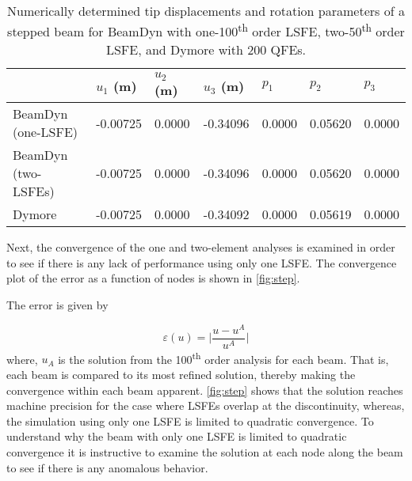 \documentclass[letterpaper,12pt]{article}
\begin{document}

\begin{table}
\caption{\label{tab:step3}Numerically determined tip displacements and rotation parameters of a stepped beam for BeamDyn with one-100\textsuperscript{th} order LSFE, two-50\textsuperscript{th} order LSFE, and Dymore with 200 QFEs. } 
\begin{center}
    \begin{tabular}{| l | l | l | l | l | l | l |}
    	\hline
    	        & $u_1$ (m) & $u_2$ (m) & $u_3$ (m) & $p_1$  & $p_2$   & $p_3$  \\ \hline
    	BeamDyn (one-LSFE) & -0.00725     & 0.0000       & -0.34096     & 0.0000 & 0.05620 & 0.0000 \\ \hline
    		BeamDyn (two-LSFEs) & -0.00725     & 0.0000       & -0.34096     & 0.0000 & 0.05620 & 0.0000 \\ \hline
    	Dymore  & -0.00725     & 0.0000       & -0.34092     & 0.0000 & 0.05619 & 0.0000 \\ \hline
    \end{tabular}
\end{center}
\end{table}

Next, the convergence of the one and two-element analyses is examined in order to see if there is any lack of performance using only one LSFE. The convergence plot of the error as a function of nodes is shown in \ref{fig:step}. 


The error is given by  

\begin{equation}
\varepsilon(u)=\bigg|\frac{u-u^A}{u^A}\bigg|
\end{equation}
where, $u_A$ is the solution from the 100\textsuperscript{th} order analysis for each beam. That is, each beam is compared to its most refined solution, thereby making the convergence within each beam apparent. \ref{fig:step} shows that the solution reaches machine precision for the case where LSFEs overlap at the discontinuity, whereas, the simulation using only one LSFE is limited to quadratic convergence. To understand why the beam with only one LSFE is limited to quadratic convergence it is instructive to examine the solution at each node along the beam to see if there is any anomalous behavior. 
\end{document}
